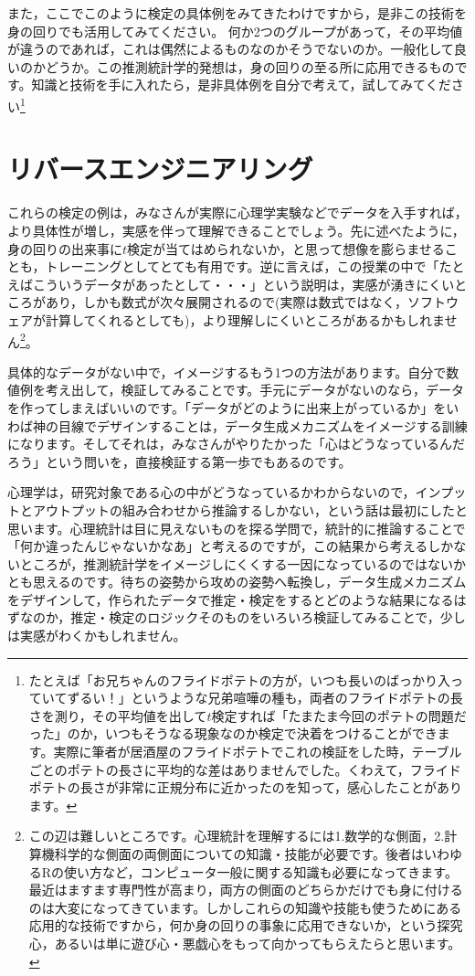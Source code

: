 \documentclass{ltjsarticle}
\begin{document}
また，ここでこのように検定の具体例をみてきたわけですから，是非この技術を身の回りでも活用してみてください。
何か2つのグループがあって，その平均値が違うのであれば，これは偶然によるものなのかそうでないのか。一般化して良いのかどうか。この推測統計学的発想は，身の回りの至る所に応用できるものです。知識と技術を手に入れたら，是非具体例を自分で考えて，試してみてください\footnote{たとえば「お兄ちゃんのフライドポテトの方が，いつも長いのばっかり入っていてずるい！」というような兄弟喧嘩の種も，両者のフライドポテトの長さを測り，その平均値を出して$t$検定すれば「たまたま今回のポテトの問題だった」のか，いつもそうなる現象なのか検定で決着をつけることができます。実際に筆者が居酒屋のフライドポテトでこれの検証をした時，テーブルごとのポテトの長さに平均的な差はありませんでした。くわえて，フライドポテトの長さが非常に正規分布に近かったのを知って，感心したことがあります。}

\section{リバースエンジニアリング}
これらの検定の例は，みなさんが実際に心理学実験などでデータを入手すれば，より具体性が増し，実感を伴って理解できることでしょう。先に述べたように，身の回りの出来事に$t$検定が当てはめられないか，と思って想像を膨らませることも，トレーニングとしてとても有用です。逆に言えば，この授業の中で「たとえばこういうデータがあったとして・・・」という説明は，実感が湧きにくいところがあり，しかも数式が次々展開されるので(実際は数式ではなく，ソフトウェアが計算してくれるとしても)，より理解しにくいところがあるかもしれません\footnote{この辺は難しいところです。心理統計を理解するには1.数学的な側面，2.計算機科学的な側面の両側面についての知識・技能が必要です。後者はいわゆるRの使い方など，コンピュータ一般に関する知識も必要になってきます。最近はますます専門性が高まり，両方の側面のどちらかだけでも身に付けるのは大変になってきています。しかしこれらの知識や技能も使うためにある応用的な技術ですから，何か身の回りの事象に応用できないか，という探究心，あるいは単に遊び心・悪戯心をもって向かってもらえたらと思います。}。

具体的なデータがない中で，イメージするもう1つの方法があります。自分で数値例を考え出して，検証してみることです。手元にデータがないのなら，データを作ってしまえばいいのです。「データがどのように出来上がっているか」をいわば神の目線でデザインすることは，データ生成メカニズムをイメージする訓練になります。そしてそれは，みなさんがやりたかった「心はどうなっているんだろう」という問いを，直接検証する第一歩でもあるのです。

心理学は，研究対象である心の中がどうなっているかわからないので，インプットとアウトプットの組み合わせから推論するしかない，という話は最初にしたと思います。心理統計は目に見えないものを探る学問で，統計的に推論することで「何か違ったんじゃないかなあ」と考えるのですが，この結果から考えるしかないところが，推測統計学をイメージしにくくする一因になっているのではないかとも思えるのです。待ちの姿勢から攻めの姿勢へ転換し，データ生成メカニズムをデザインして，作られたデータで推定・検定をするとどのような結果になるはずなのか，推定・検定のロジックそのものをいろいろ検証してみることで，少しは実感がわくかもしれません。
\end{document}
